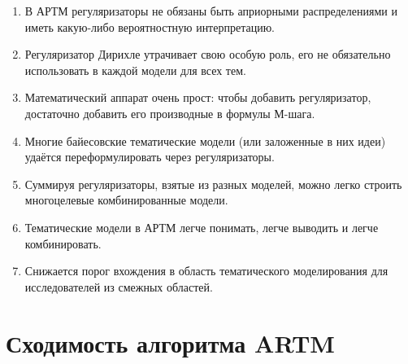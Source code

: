 \documentclass[12pt]{article}
\begin{document}
\begin{enumerate}
\item В АРТМ регуляризаторы не обязаны быть априорными распределениями и иметь какую-либо вероятностную интерпретацию.
\item Регуляризатор Дирихле утрачивает свою особую роль, его не обязательно использовать в каждой модели для всех тем.
\item Математический аппарат очень прост: чтобы добавить регуляризатор, достаточно добавить его производные в формулы М-шага.
\item Многие байесовские тематические модели (или заложенные в них идеи) удаётся переформулировать через регуляризаторы.
\item Суммируя регуляризаторы, взятые из разных моделей, можно легко строить многоцелевые комбинированные модели.
\item Тематические модели в АРТМ легче понимать, легче выводить и легче комбинировать.
\item Снижается порог вхождения в область тематического моделирования для исследователей из смежных областей.
\end{enumerate}
	\section{Сходимость алгоритма ARTM}
\end{document}

